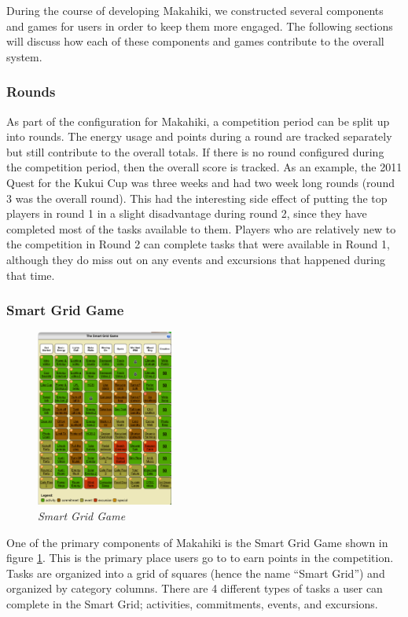 \documentclass{acm_proc_article-sp}
\begin{document}
During the course of developing Makahiki, we constructed several components and games for users in order to keep them more engaged. The following sections will discuss how each of these components and games contribute to the overall system.

\subsubsection{Rounds}

As part of the configuration for Makahiki, a competition period can be split up into rounds. The energy usage and points during a round are tracked separately but still contribute to the overall totals. If there is no round configured during the competition period, then the overall score is tracked. As an example, the 2011 Quest for the Kukui Cup was three weeks and had two week long rounds (round 3 was the overall round). This had the interesting side effect of putting the top players in round 1 in a slight disadvantage during round 2, since they have completed most of the tasks available to them. Players who are relatively new to the competition in Round 2 can complete tasks that were available in Round 1, although they do miss out on any events and excursions that happened during that time.

\subsubsection{Smart Grid Game}

\begin{figure}[ht!]
  \center
  \includegraphics[width=0.4\textwidth]{smart-grid.eps}
  \caption{\em \small Smart Grid Game}
  \label{fig:SmartGrid}
\end{figure}

One of the primary components of Makahiki is the Smart Grid Game shown in figure \ref{fig:SmartGrid}. This is the primary place users go to to earn points in the competition. Tasks are organized into a grid of squares (hence the name ``Smart Grid'') and organized by category columns. There are 4 different types of tasks a user can complete in the Smart Grid; activities, commitments, events, and excursions.
\end{document}
